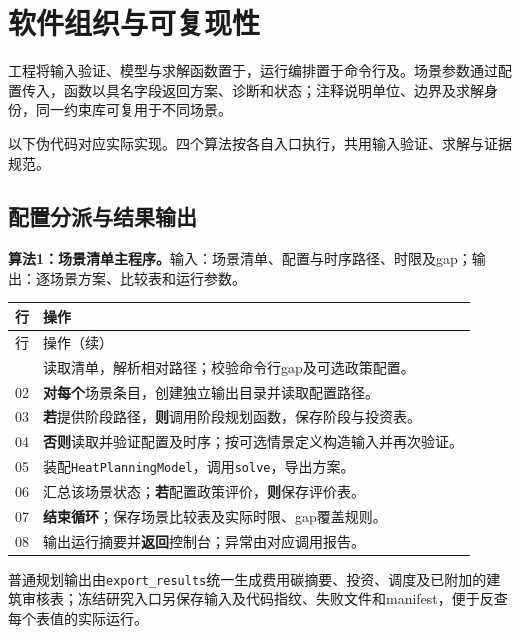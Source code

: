 \section{软件组织与可复现性}

工程将输入验证、模型与求解函数置于，运行编排置于命令行及。场景参数通过配置传入，函数以具名字段返回方案、诊断和状态；注释说明单位、边界及求解身份，同一约束库可复用于不同场景。

以下伪代码对应实际实现。四个算法按各自入口执行，共用输入验证、求解与证据规范。

\subsection{配置分派与结果输出}
\noindent\textbf{算法1：场景清单主程序。}输入：场景清单、配置与时序路径、时限及gap；输出：逐场景方案、比较表和运行参数。
\begin{longtable}{@{}p{}p{}@{}}
\toprule 行 & 操作\\\midrule
\endfirsthead
\toprule 行 & 操作（续）\\\midrule
\endhead
\bottomrule\endfoot
01 & 读取清单，解析相对路径；校验命令行gap及可选政策配置。\\
02 & \textbf{对每个}场景条目，创建独立输出目录并读取配置路径。\\
03 & \quad\textbf{若}提供阶段路径，\textbf{则}调用阶段规划函数，保存阶段与投资表。\\
04 & \quad\textbf{否则}读取并验证配置及时序；按可选情景定义构造输入并再次验证。\\
05 & \quad\quad{}装配\texttt{HeatPlanningModel}，调用\texttt{solve}，导出方案。\\
06 & \quad{}汇总该场景状态；\textbf{若}配置政策评价，\textbf{则}保存评价表。\\
07 & \textbf{结束循环}；保存场景比较表及实际时限、gap覆盖规则。\\
08 & 输出运行摘要并\textbf{返回}控制台；异常由对应调用报告。\\
\end{longtable}
普通规划输出由\texttt{export\_results}统一生成费用碳摘要、投资、调度及已附加的建筑审核表；冻结研究入口另保存输入及代码指纹、失败文件和manifest，便于反查每个表值的实际运行。

